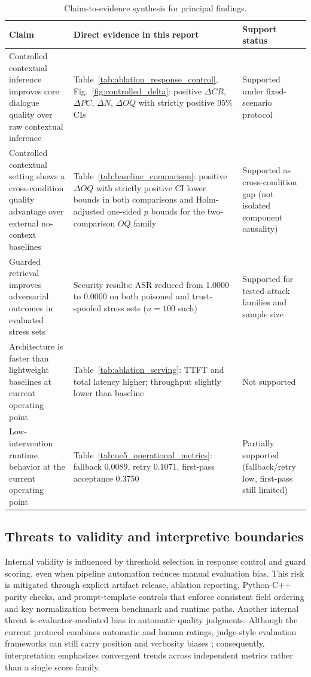 ﻿\documentclass[a4paper,12pt]{article}
\begin{document}
\begin{table}[t]
\centering
\caption{Claim-to-evidence synthesis for principal findings.}
\label{tab:claim_evidence_map}
\begingroup
\footnotesize
\setlength{\tabcolsep}{4pt}
\begin{tabular}{p{}p{}p{}}
\toprule
Claim & Direct evidence in this report & Support status \\
\midrule
Controlled contextual inference improves core dialogue quality over raw contextual inference & Table~\ref{tab:ablation_response_control}, Fig.~\ref{fig:controlled_delta}: positive \(\Delta CR\), \(\Delta PC\), \(\Delta N\), \(\Delta OQ\) with strictly positive 95\% CIs & Supported under fixed-scenario protocol \\
Controlled contextual setting shows a cross-condition quality advantage over external no-context baselines & Table~\ref{tab:baseline_comparison}: positive \(\Delta OQ\) with strictly positive CI lower bounds in both comparisons and Holm-adjusted one-sided \(p\) bounds for the two-comparison \(OQ\) family & Supported as cross-condition gap (not isolated component causality) \\
Guarded retrieval improves adversarial outcomes in evaluated stress sets & Security results: ASR reduced from 1.0000 to 0.0000 on both poisoned and trust-spoofed stress sets (\(n=100\) each) & Supported for tested attack families and sample size \\
Architecture is faster than lightweight baselines at current operating point & Table~\ref{tab:ablation_serving}: TTFT and total latency higher; throughput slightly lower than baseline & Not supported \\
Low-intervention runtime behavior at the current operating point & Table~\ref{tab:ue5_operational_metrics}: fallback 0.0089, retry 0.1071, first-pass acceptance 0.3750 & Partially supported (fallback/retry low, first-pass still limited) \\
\bottomrule
\end{tabular}
\endgroup
\end{table}

\subsection{Threats to validity and interpretive boundaries}
Internal validity is influenced by threshold selection in response control and guard scoring, even when pipeline automation reduces manual evaluation bias. This risk is mitigated through explicit artifact release, ablation reporting, Python-C++ parity checks, and prompt-template controls that enforce consistent field ordering and key normalization between benchmark and runtime paths. Another internal threat is evaluator-mediated bias in automatic quality judgments. Although the current protocol combines automatic and human ratings, judge-style evaluation frameworks can still carry position and verbosity biases \cite{Zheng2023MTBench,Wang2024Judge,Dubois2024AlpacaEval}; consequently, interpretation emphasizes convergent trends across independent metrics rather than a single score family.
\end{document}
